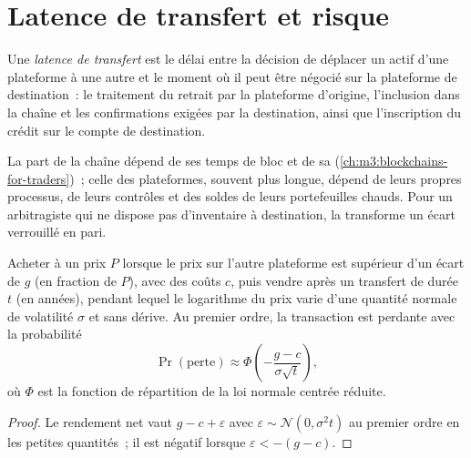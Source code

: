 \section{Latence de transfert et risque}

\begin{definition}\label{def:m3:spot-markets:latency}
Une \emph{latence de transfert} est le délai entre la décision de déplacer un actif d'une
plateforme à une autre et le moment où il peut être négocié sur la plateforme de destination~: le traitement du retrait
par la plateforme d'origine, l'inclusion dans la chaîne et les confirmations exigées par la destination, ainsi que
l'inscription du crédit sur le compte de destination.
\end{definition}

La part de la chaîne dépend de ses temps de bloc et de sa  (\cref{ch:m3:blockchains-for-traders})~; celle des
plateformes, souvent plus longue, dépend de leurs propres processus, de leurs contrôles et des soldes de leurs portefeuilles chauds. Pour un arbitragiste
qui ne dispose pas d'inventaire à destination, la  transforme un écart verrouillé en pari.

\begin{proposition}\label{prop:m3:spot-markets:ploss}
Acheter à un prix $P$ lorsque le prix sur l'autre plateforme est supérieur d'un écart de $g$ (en fraction de $P$), avec des
coûts $c$, puis vendre après un transfert de durée $t$ (en années), pendant lequel le logarithme du prix varie d'une
quantité normale de volatilité $\sigma$ et sans dérive. Au premier ordre, la transaction est perdante avec la probabilité
\[
\Pr(\text{perte}) \approx \Phi\!\left(-\frac{g - c}{\sigma\sqrt{t}}\right),
\]
où $\Phi$ est la fonction de répartition de la loi normale centrée réduite.
\end{proposition}

\begin{proof}
Le rendement net vaut $g - c + \varepsilon$ avec $\varepsilon \sim \mathcal{N}(0, \sigma^2 t)$ au premier ordre
en les petites quantités~; il est négatif lorsque $\varepsilon < -(g - c)$.
\end{proof}

